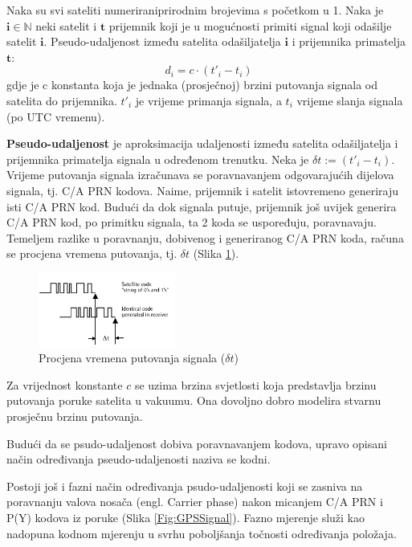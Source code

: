 \documentclass[a4paper,twoside,12pt]{memoir} %
\begin{document}
	\begin{defn}
		Naka su svi sateliti numeriraniprirodnim  brojevima s početkom 
		u 1. Naka je $\mathbf{i} \in \mathbb{N}$ neki satelit i $\mathbf{t}$ prijemnik
		koji je u mogućnosti primiti signal koji odašilje satelit $\mathbf{i}$. Pseudo-udaljenost
		između satelita odašiljatelja $\mathbf{i}$ i prijemnika primatelja $\textbf{t}$:
		$$d_i = c\cdot(t'_i- t_i)$$
		gdje je c konstanta koja je jednaka (prosječnoj) brzini putovanja signala od satelita do prijemnika. $t'_i$ je vrijeme primanja signala, a $t_i$ vrijeme slanja signala
		(po UTC vremenu).
	\end{defn}
	\textbf{Pseudo-udaljenost} je aproksimacija udaljenosti između satelita odašiljatelja i prijemnika primatelja signala u određenom trenutku.
	Neka je $\delta t := (t'_i- t_i)$. Vrijeme putovanja signala izračunava se poravnavanjem odgovarajućih dijelova signala, tj. C/A PRN kodova.
	Naime, prijemnik i satelit istovremeno generiraju isti C/A PRN kod. Budući da 
	dok signala putuje, prijemnik još uvijek generira C/A PRN kod, po primitku signala,
	ta 2 koda se uspoređuju, poravnavaju. Temeljem razlike u poravnanju, dobivenog i generiranog C/A PRN koda,
	računa se procjena vremena putovanja, tj. $\delta t$ (Slika \ref{fig:deltat}).
	\begin{figure}[H]
		\centering
		\includegraphics[width=0.4\textwidth]{deltat}
		\caption{Procjena vremena putovanja signala ($\delta t$)}
		\label{fig:deltat}
	\end{figure}
	Za vrijednost konstante $c$ se uzima brzina svjetlosti koja predstavlja brzinu putovanja poruke satelita u vakuumu. Ona dovoljno dobro modelira stvarnu prosječnu brzinu putovanja.
	
	Budući da se psudo-udaljenost dobiva poravnavanjem kodova\label{stranica:kodno},
	upravo opisani način određivanja pseudo-udaljenosti naziva se kodni.
	
	Postoji još i fazni način određivanja psudo-udaljenosti koji se zasniva na poravnanju valova nosača (engl. Carrier phase) nakon micanjem C/A PRN i P(Y) kodova  iz poruke (Slika \ref{Fig:GPSSignal}).
	Fazno mjerenje služi kao nadopuna kodnom mjerenju u svrhu poboljšanja točnosti određivanja položaja.
	
\end{document}
